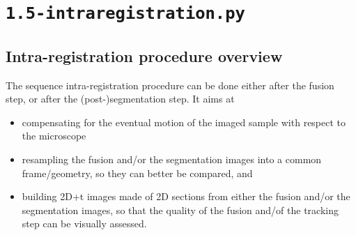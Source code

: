 \section{\texttt{1.5-intraregistration.py}}
\label{sec:cli:intraregistration}

\subsection{Intra-registration procedure overview}

The sequence intra-registration procedure can be done either after the fusion step, or after the (post-)segmentation step. It aims at
\begin{itemize}
\itemsep -0.5ex
\item compensating for the eventual motion of the imaged sample with respect to the microscope
\item resampling the fusion and/or the segmentation images into a common frame/geometry, so they can better be compared, and
\item building 2D+t images made of 2D sections from either the  fusion
  and/or the segmentation images, so that the quality of the fusion
  and/of the tracking step can be visually assessed. 
\end{itemize}


